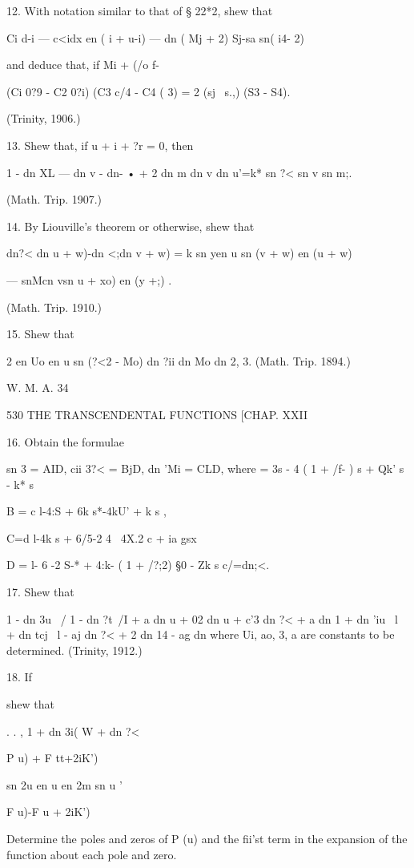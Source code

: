 12. With notation similar to that of § 22*2, shew that

Ci d-i — c<idx en ( i + u-i) — dn ( Mj + 2) Sj-sa sn( i4- 2)

and deduce that, if Mi + (/o f-%

(Ci 0?9 - C2 0?i) (C3 c/4 - C4 ( 3) = 2 (sj \ s.,) (S3 - S4).

(Trinity, 1906.)

13. Shew that, if u + i + ?r = 0, then

1 - dn XL — dn v - dn- • + 2 dn m dn v dn u'=k* sn ?< sn v sn m;.

(Math. Trip. 1907.)

14. By Liouville's theorem or otherwise, shew that

dn?< dn u + w)-dn <;dn v + w) = k sn yen u sn (v + w) en (u + w)

— snMcn vsn u + xo) en (y +;) .

(Math. Trip. 1910.)

15. Shew that

2 en Uo en u sn (?<2 - %
Mo) dn ?ii dn Mo dn %
2, 3. (Math. Trip. 1894.)

W. M. A. 34

530 THE TRANSCENDENTAL FUNCTIONS [CHAP. XXII

16. Obtain the formulae

sn 3 = AID, cii 3?< = BjD, dn 'Mi = CLD, where = 3s - 4 ( 1 + /f- ) s
+ Qk' s - k* s%

B = c l-4:S + 6k s*-4kU' + k s ,

C=d l-4k s + 6/5-2 4 \ 4X.2 c + ia gsx

D = l- 6 -2 S-* + 4:k- ( 1 + /?;2) §0 - Zk s%
c/=dn;<.

17. Shew that

1 - dn 3u \ / 1 - dn ?t\ /I + a dn u + 02 dn u + c'3 dn ?< + a dn 1 +
dn 'iu \ l + dn tcj \ l - aj dn ?< + 2 dn 14 - ag dn %
where Ui, ao, 3, a are constants to be determined. (Trinity, 1912.)

18. If

shew that

  . . , 1 + dn 3i( W + dn ?<

P u) + F tt+2iK')

sn 2u en u en 2m sn u '

F u)-F u + 2iK')

Determine the poles and zeros of P (u) and the fii'st term in the
expansion of the function about each pole and zero.

